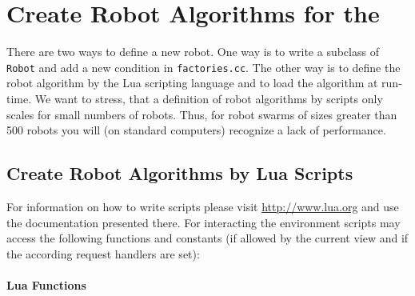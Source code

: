 \section{Create Robot Algorithms for the \RSS}
There are two ways to define a new robot. One way is to write a subclass of \texttt{Robot} and add a new condition in \texttt{factories.cc}. The other way is to define the robot algorithm by the {\sffamily Lua} scripting language and to load the algorithm at run-time. We want to stress, that a definition of robot algorithms by \Lua scripts only scales for small numbers of robots. Thus, for robot swarms of sizes greater than 500 robots you will (on standard computers) recognize a lack of performance.

\subsection{Create Robot Algorithms by Lua Scripts}
For information on how to write \Lua scripts please visit \url{http://www.lua.org} and use the documentation presented there. For interacting the environment \Lua scripts may access the following functions and constants (if allowed by the current view and if the according request handlers are set):

\paragraph{Lua Functions}

